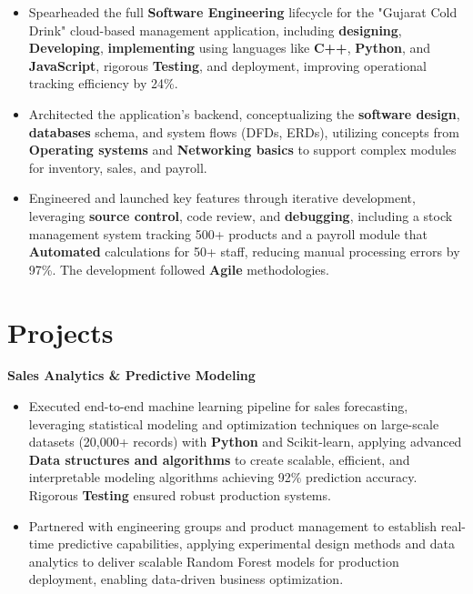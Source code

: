 \documentclass[a4paper,10pt]{article}
\begin{document}
\begin{itemize}[leftmargin=*, itemsep=0pt, parsep=1pt] %
\vspace{-7mm}
    \item Spearheaded the full \textbf{Software Engineering} lifecycle for the "Gujarat Cold Drink" cloud-based management application, including \textbf{designing}, \textbf{Developing}, \textbf{implementing} using languages like \textbf{C++}, \textbf{Python}, and \textbf{JavaScript}, rigorous \textbf{Testing}, and deployment, improving operational tracking efficiency by 24\%.
\item Architected the application's backend, conceptualizing the \textbf{software design}, \textbf{databases} schema, and system flows (DFDs, ERDs), utilizing concepts from \textbf{Operating systems} and \textbf{Networking basics} to support complex modules for inventory, sales, and payroll.
\item Engineered and launched key features through iterative development, leveraging \textbf{source control}, code review, and \textbf{debugging}, including a stock management system tracking 500+ products and a payroll module that \textbf{Automated} calculations for 50+ staff, reducing manual processing errors by 97\%. The development followed \textbf{Agile} methodologies.

\end{itemize}

\vspace{-4mm}

\section*{Projects}
\textbf{Sales Analytics \& Predictive Modeling} \\
\begin{itemize}[leftmargin=*, itemsep=0pt, parsep=1pt]
\vspace{-7mm}
    \item Executed end-to-end machine learning pipeline for sales forecasting, leveraging statistical modeling and optimization techniques on large-scale datasets (20,000+ records) with \textbf{Python} and Scikit-learn, applying advanced \textbf{Data structures and algorithms} to create scalable, efficient, and interpretable modeling algorithms achieving 92\% prediction accuracy. Rigorous \textbf{Testing} ensured robust production systems.
    \item Partnered with engineering groups and product management to establish real-time predictive capabilities, applying experimental design methods and data analytics to deliver scalable Random Forest models for production deployment, enabling data-driven business optimization.
    \end{itemize}
\end{document}
